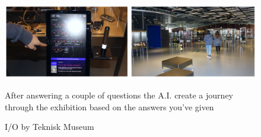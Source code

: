 \begin{figure}[H]
\includegraphics[width=13cm]{pictures/process/tm_ai.png}
\caption{I/O by Teknisk Museum}{After answering a couple of questions the A.I. create a journey through the exhibition based on the answers you've given}
\centering 
\end{figure}


